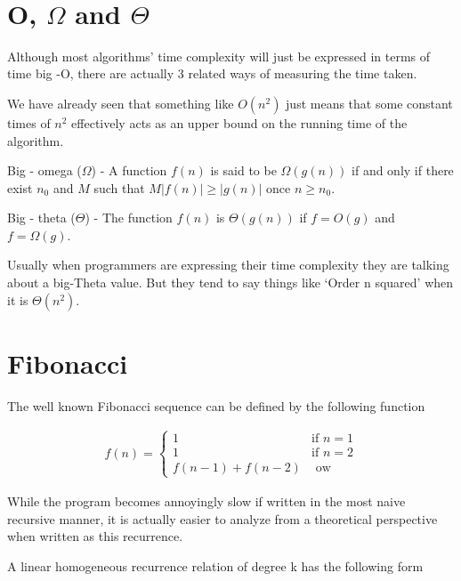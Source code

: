 \documentclass[12pt]{article}
\begin{document}
\begin{center}
\\
\vspace{1cm}
\end{center}

\vspace{0.5cm}\noindent

\section*{O, $\Omega$ and $\Theta$}
Although most algorithms' time complexity will just be expressed in terms of time big -O, there are actually 3 related ways of measuring the time taken. 

We have already seen that something like $O(n^2)$ just means that some constant times of $n^2$ effectively acts as an upper bound on the running time of the algorithm.

Big - omega ($\Omega$) - A function $f(n)$ is said to be $\Omega(g(n))$ if and only if there exist $n_0$ and $M$ such that $M|f(n)| \ge |g(n)|$ once $n \ge n_0$.

Big - theta ($\Theta$) - The function $f(n)$ is $\Theta(g(n))$ if $f=O(g)$ and $f=\Omega(g)$.

Usually when programmers are expressing their time complexity they are talking about a big-Theta value. But they tend to say things like `Order n squared'  when it is $\Theta(n^2)$.


\section*{Fibonacci}
The well known Fibonacci sequence can be defined by the following function

\begin{align*}
f(n) = \begin{cases}
1 & \mbox{if } n=1 \\
1 & \mbox{if } n = 2 \\
f(n-1) + f(n-2) & \mbox{ ow }
\end{cases}
\end{align*}

While the program becomes annoyingly slow if written in the most naive recursive manner, it is actually easier to analyze from a theoretical perspective when written as this recurrence.

A linear homogeneous recurrence relation of degree k has the following form
\end{document}
